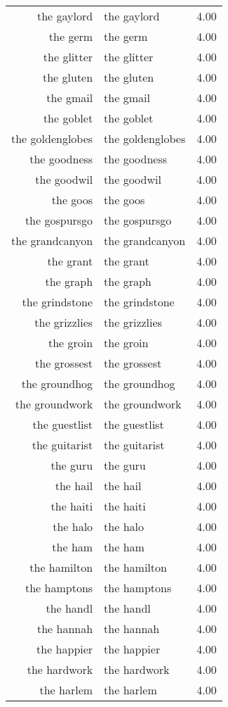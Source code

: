 \begin{table}[ht]
\begin{tabular}{rlr}
  the gaylord & the gaylord & 4.00 \\ 
  the germ & the germ & 4.00 \\ 
  the glitter & the glitter & 4.00 \\ 
  the gluten & the gluten & 4.00 \\ 
  the gmail & the gmail & 4.00 \\ 
  the goblet & the goblet & 4.00 \\ 
  the goldenglobes & the goldenglobes & 4.00 \\ 
  the goodness & the goodness & 4.00 \\ 
  the goodwil & the goodwil & 4.00 \\ 
  the goos & the goos & 4.00 \\ 
  the gospursgo & the gospursgo & 4.00 \\ 
  the grandcanyon & the grandcanyon & 4.00 \\ 
  the grant & the grant & 4.00 \\ 
  the graph & the graph & 4.00 \\ 
  the grindstone & the grindstone & 4.00 \\ 
  the grizzlies & the grizzlies & 4.00 \\ 
  the groin & the groin & 4.00 \\ 
  the grossest & the grossest & 4.00 \\ 
  the groundhog & the groundhog & 4.00 \\ 
  the groundwork & the groundwork & 4.00 \\ 
  the guestlist & the guestlist & 4.00 \\ 
  the guitarist & the guitarist & 4.00 \\ 
  the guru & the guru & 4.00 \\ 
  the hail & the hail & 4.00 \\ 
  the haiti & the haiti & 4.00 \\ 
  the halo & the halo & 4.00 \\ 
  the ham & the ham & 4.00 \\ 
  the hamilton & the hamilton & 4.00 \\ 
  the hamptons & the hamptons & 4.00 \\ 
  the handl & the handl & 4.00 \\ 
  the hannah & the hannah & 4.00 \\ 
  the happier & the happier & 4.00 \\ 
  the hardwork & the hardwork & 4.00 \\ 
  the harlem & the harlem & 4.00 \\ 

\end{tabular}
\end{table}
